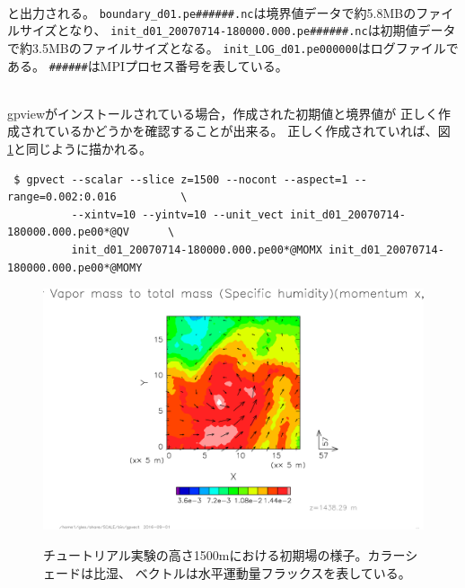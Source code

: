 \\

\noindent
と出力される。
\verb|boundary_d01.pe######.nc|は境界値データで約5.8MBのファイルサイズとなり、
\verb|init_d01_20070714-180000.000.pe######.nc|は初期値データで約3.5MBのファイルサイズとなる。
\verb|init_LOG_d01.pe000000|はログファイルである。
\verb|######|はMPIプロセス番号を表している。


\vspace{1cm}
 \hrulefill \\
gpviewがインストールされている場合，作成された初期値と境界値が
正しく作成されているかどうかを確認することが出来る。
正しく作成されていれば、図 \ref{fig:init}と同じように描かれる。

\begin{verbatim}
 $ gpvect --scalar --slice z=1500 --nocont --aspect=1 --range=0.002:0.016          \
          --xintv=10 --yintv=10 --unit_vect init_d01_20070714-180000.000.pe00*@QV      \
          init_d01_20070714-180000.000.pe00*@MOMX init_d01_20070714-180000.000.pe00*@MOMY
\end{verbatim}


\begin{figure}[h]
\begin{center}
  \includegraphics[width=0.9\hsize]{./figure/real_init_qv-momxy.eps}\\
  \caption{チュートリアル実験の高さ1500mにおける初期場の様子。カラーシェードは比湿、
           ベクトルは水平運動量フラックスを表している。}
  \label{fig:init}
\end{center}
\end{figure}

